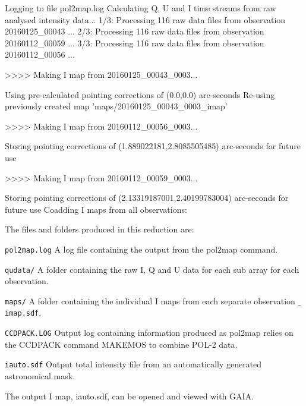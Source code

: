 \begin{terminalv}
Logging to file pol2map.log
Calculating Q, U and I time streams from raw analysed intensity data...
   1/3: Processing 116 raw data files from observation 20160125_00043 ...
   2/3: Processing 116 raw data files from observation 20160112_00059 ...
   3/3: Processing 116 raw data files from observation 20160112_00056 ...

>>>>   Making I map from 20160125_00043_0003...

   Using pre-calculated pointing corrections of (0.0,0.0) arc-seconds
   Re-using previously created map 'maps/20160125_00043_0003_imap'

>>>>   Making I map from 20160112_00056_0003...

Storing pointing corrections of (1.889022181,2.8085505485) arc-seconds for future use

>>>>   Making I map from 20160112_00059_0003...

Storing pointing corrections of (2.13319187001,2.40199783004) arc-seconds for future use
Coadding I maps from all observations:
\end{terminalv}

The files and folders produced in this reduction are:


\begin{aligndesc}
\item[\texttt{pol2map.log}] 
A log file containing the output from the pol2map command.

\item[\texttt{qudata/}]
A folder containing the raw I, Q and U data for each sub array for each observation.

\item[\texttt{maps/}]
A folder containing the individual I maps from each separate observation \texttt{$\_$imap.sdf}.

\item[\texttt{CCDPACK.LOG}]
Output log containing information produced as pol2map relies on the CCDPACK command MAKEMOS
to combine POL-2 data.

\item[\texttt{iauto.sdf}]
Output total intensity file from an automatically generated astronomical mask.


\end{aligndesc}

The output I map, iauto.sdf, can be opened and viewed with GAIA.

